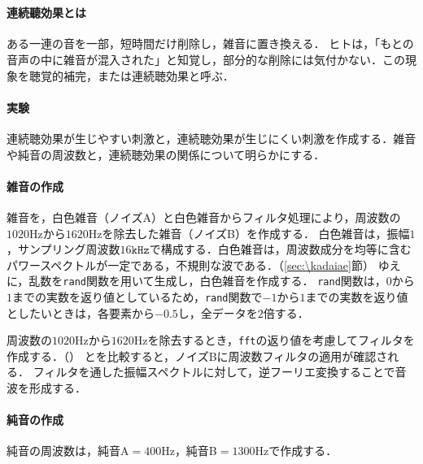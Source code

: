 \section{\kadaidb}\label{sec:\kadaidb}
\purpose
\paragraph{連続聽効果とは}
ある一連の音を一部，短時間だけ削除し，雑音に置き換える．
ヒトは，「もとの音声の中に雑音が混入された」と知覚し，部分的な削除には気付かない．この現象を聴覚的補完，または連続聴効果と呼ぶ．\cite[p.182\ -\ p.183]{感覚知覚心理学}
\paragraph{実験}
連続聴効果が生じやすい刺激と，連続聴効果が生じにくい刺激を作成する．雑音や純音の周波数と，連続聴効果の関係について明らかにする．
\method
\paragraph{雑音の作成}
雑音を，白色雑音（ノイズA）と白色雑音からフィルタ処理により，周波数の\(1020\textrm{Hz}\)から\(1620\textrm{Hz}\)を除去した雑音（ノイズB）を作成する．
白色雑音は，振幅\(1\)，サンプリング周波数\(16\texttt{kHz}\)で構成する．白色雑音は，周波数成分を均等に含むパワースペクトルが一定である，不規則な波である．（\ref{sec:\kadaiae}節）
ゆえに，乱数を\texttt{rand}関数を用いて生成し，白色雑音を作成する．
\texttt{rand}関数は，\(0\)から\(1\)までの実数を返り値としているため，\texttt{rand}関数で\(-1\)から\(1\)までの実数を返り値としたいときは，各要素から\(-0.5\)し，全データを\(2\)倍する．\par
周波数の\(1020\textrm{Hz}\)から\(1620\textrm{Hz}\)を除去するとき，\texttt{fft}の返り値を考慮してフィルタを作成する．（）
とを比較すると，ノイズBに周波数フィルタの適用が確認される．
フィルタを通した振幅スペクトルに対して，逆フーリエ変換することで音波を形成する．\par
\paragraph{純音の作成}純音の周波数は，純音A\(=400\textrm{Hz}\)，純音B\(=1300\textrm{Hz}\)で作成する．
